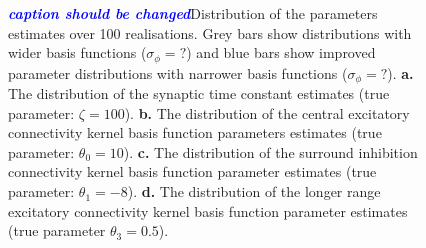 \documentclass[twocolumn,11pt,a4paper]{article}		%
\newcommand{\parham}[1]{\textsf{\emph{\textbf{\textcolor{blue}{#1}}}}}
\begin{document}
\begin{figure}[th]
\caption{\parham{caption should be changed}Distribution of the parameters estimates over 100
realisations. Grey bars show distributions with wider basis functions ($\sigma_{\phi} = ?$) and blue bars show improved parameter distributions with narrower basis functions ($\sigma_{\phi} = ?$). \textbf{a.} The distribution of the synaptic time constant estimates (true parameter: $\zeta=100$). \textbf{b.} The distribution of the central excitatory connectivity kernel basis function parameters estimates (true parameter: $\theta_0 = 10$). \textbf{c.} The distribution of the surround inhibition connectivity kernel basis function parameter estimates (true parameter: $\theta_1 = -8$). \textbf{d.} The distribution of the longer range excitatory connectivity kernel basis function parameter estimates (true parameter $\theta_3 = 0.5$).}
\label{fig:Parameters}
\end{figure}
\end{document}
